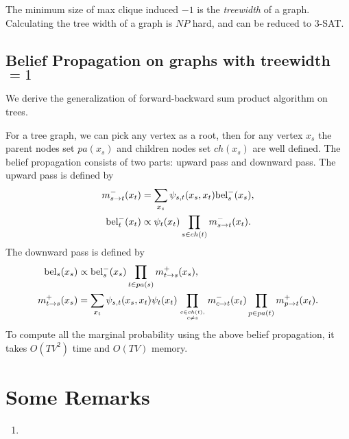 \documentclass{article}
\begin{document}
The minimum size of max clique induced $-1$ is the \emph{treewidth} of a graph. Calculating the tree width of a graph is $NP$ hard, and can be reduced to $3$-SAT. 


\subsection{Belief Propagation on graphs with treewidth $=1$}
We derive the generalization of forward-backward sum product algorithm on trees.
\begin{center}
\end{center}
For a tree graph, we can pick any vertex as a root, then for any vertex $x_s$ the parent nodes set $pa(x_s)$ and children nodes set $ch(x_s)$ are well defined. The belief propagation consists of two parts: upward pass and downward pass. The upward pass is defined by
\begin{align*}
m_{s\rightarrow t}^-(x_t)&=\sum_{x_s}\psi_{s,t}(x_s,x_t){\rm bel}_s^-(x_s),\\
{\rm bel}_t^-(x_t)&\propto \psi_t(x_t)\prod_{s\in ch(t)}m_{s\rightarrow t}^-(x_t).
\end{align*}
The downward pass is defined by
\begin{align*}
{\rm bel}_s(x_s)&\propto {\rm bel}_s^-(x_s)\prod_{t\in pa(s)}m_{t\rightarrow s}^+(x_s),\\
m_{t\rightarrow s}^+(x_s)&=\sum_{x_t}\psi_{s,t}(x_s,x_t)\psi_t(x_t)\prod_{c\in ch(t),\atop c\neq s}m_{c\rightarrow t}^-(x_t)\prod_{p\in pa(t)}m^+_{p\rightarrow t}(x_t).
\end{align*}
To compute all the marginal probability using the above belief propagation, it takes $O(TV^2)$ time and $O(TV)$ memory.

\section{Some Remarks}
\begin{enumerate}
\item
\end{enumerate}
\end{document}
